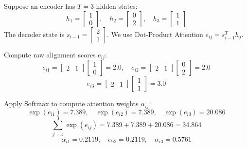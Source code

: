 \documentclass[a4paper,11pt]{article}
\begin{document}
\begin{worked}
Suppose an encoder has $T=3$ hidden states:
$$h_1 = \begin{bmatrix} 1 \\ 0 \end{bmatrix}, \quad h_2 = \begin{bmatrix} 0 \\ 2 \end{bmatrix}, \quad h_3 = \begin{bmatrix} 1 \\ 1 \end{bmatrix}$$
The decoder state is $s_{i-1} = \begin{bmatrix} 2 \\ 1 \end{bmatrix}$. We use Dot-Product Attention $e_{ij} = s_{i-1}^T h_j$.

\begin{steps}
\item Compute raw alignment scores $e_{ij}$:
$$e_{i1} = \begin{bmatrix} 2 & 1 \end{bmatrix} \begin{bmatrix} 1 \\ 0 \end{bmatrix} = 2.0, \quad e_{i2} = \begin{bmatrix} 2 & 1 \end{bmatrix} \begin{bmatrix} 0 \\ 2 \end{bmatrix} = 2.0$$
$$e_{i3} = \begin{bmatrix} 2 & 1 \end{bmatrix} \begin{bmatrix} 1 \\ 1 \end{bmatrix} = 3.0$$

\item Apply Softmax to compute attention weights $\alpha_{ij}$:
$$\exp(e_{i1}) = 7.389, \quad \exp(e_{i2}) = 7.389, \quad \exp(e_{i3}) = 20.086$$
$$\sum_{j=1}^{3} \exp(e_{ij}) = 7.389 + 7.389 + 20.086 = 34.864$$
$$\alpha_{i1} = 0.2119, \quad \alpha_{i2} = 0.2119, \quad \alpha_{i3} = 0.5761$$


\end{steps}
\end{worked}
\end{document}
